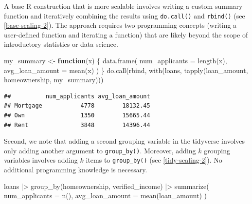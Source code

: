 \documentclass[12pt]{article}
\newenvironment{Shaded}{\begin{snugshade}}{\end{snugshade}}
\newcommand{\AttributeTok}[1]{\textcolor[rgb]{0.77,0.63,0.00}{#1}}
\newcommand{\ControlFlowTok}[1]{\textcolor[rgb]{0.13,0.29,0.53}{\textbf{#1}}}
\newcommand{\FunctionTok}[1]{\textcolor[rgb]{0.00,0.00,0.00}{#1}}
\newcommand{\NormalTok}[1]{#1}
\newcommand{\OtherTok}[1]{\textcolor[rgb]{0.56,0.35,0.01}{#1}}
\newcommand{\SpecialCharTok}[1]{\textcolor[rgb]{0.00,0.00,0.00}{#1}}
\begin{document}
A base R construction that is more scalable involves writing a custom
summary function and iteratively combining the results using
\texttt{do.call()} and \texttt{rbind()} (see \ref{base-scaling-2}). The
approach requires two programming concepts (writing a user-defined
function and iterating a function) that are likely beyond the scope of
introductory statistics or data science.

\linespread{1}

\begin{Shaded}
\begin{Highlighting}[]
\NormalTok{my\_summary }\OtherTok{\textless{}{-}} \ControlFlowTok{function}\NormalTok{(x) \{ }
  \FunctionTok{data.frame}\NormalTok{(}
    \AttributeTok{num\_applicants =} \FunctionTok{length}\NormalTok{(x),}
    \AttributeTok{avg\_loan\_amount =} \FunctionTok{mean}\NormalTok{(x)}
\NormalTok{  )}
\NormalTok{\}}
\FunctionTok{do.call}\NormalTok{(rbind, }\FunctionTok{with}\NormalTok{(loans, }\FunctionTok{tapply}\NormalTok{(loan\_amount, homeownership, my\_summary)))}
\end{Highlighting}
\end{Shaded}

\begin{verbatim}
##          num_applicants avg_loan_amount
## Mortgage           4778        18132.45
## Own                1350        15665.44
## Rent               3848        14396.44
\end{verbatim}


\label{base-scaling-2} \linespread{2}
\vspace{3mm}\setlength{\parindent}{15pt}

Second, we note that adding a second grouping variable in the tidyverse
involves only adding another argument to \texttt{group\_by()}. Moreover,
adding \(k\) grouping variables involves adding \(k\) items to
\texttt{group\_by()} (see \ref{tidy-scaling-2}). No additional
programming knowledge is necessary.

\linespread{1}

\begin{Shaded}
\begin{Highlighting}[]
\NormalTok{loans }\SpecialCharTok{|\textgreater{}}
  \FunctionTok{group\_by}\NormalTok{(homeownership, verified\_income) }\SpecialCharTok{|\textgreater{}}
  \FunctionTok{summarize}\NormalTok{(}
    \AttributeTok{num\_applicants =} \FunctionTok{n}\NormalTok{(),}
    \AttributeTok{avg\_loan\_amount =} \FunctionTok{mean}\NormalTok{(loan\_amount)}
\NormalTok{  )}
\end{Highlighting}
\end{Shaded}
\end{document}
